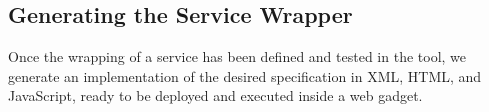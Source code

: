 

\subsection{Generating the Service Wrapper} %
\label{sub:generating_a_resource_adapter}

Once the wrapping of a service has been defined and tested in the tool, we generate an implementation of the desired specification in XML, HTML, and JavaScript, ready to be deployed and executed inside a web gadget. 


% 
% 
% 

